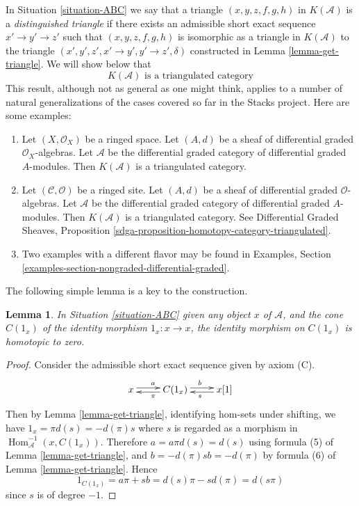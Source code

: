 \documentclass{stacks-project}
\theoremstyle{plain}
\newtheorem{lemma}[subsection]{Lemma}
\theoremstyle{definition}
\theoremstyle{remark}
\numberwithin{equation}{subsection}
\def\Hom{\mathop{\mathrm{Hom}}\nolimits}
\begin{document}
\noindent
In Situation \ref{situation-ABC} we say that a triangle
$(x, y, z, f, g, h)$ in $K(\mathcal{A})$ is a
{\it distinguished triangle} if there exists an admissible
short exact sequence $x' \to y' \to z'$ such that
$(x, y, z, f, g, h)$ is isomorphic as a triangle in $K(\mathcal{A})$
to the triangle $(x', y', z', x' \to y', y' \to z', \delta)$
constructed in Lemma \ref{lemma-get-triangle}. We will show below that
$$
\boxed{
K(\mathcal{A})\text{ is a triangulated category}
}
$$
This result, although not as general as one might think, applies to a
number of natural generalizations of the cases covered so far in the
Stacks project. Here are some examples:
\begin{enumerate}
\item Let $(X, \mathcal{O}_X)$ be a ringed space. Let $(A, d)$ be a
sheaf of differential graded $\mathcal{O}_X$-algebras. Let
$\mathcal{A}$ be the differential graded category of differential
graded $A$-modules. Then $K(\mathcal{A})$ is a triangulated category.
\item Let $(\mathcal{C}, \mathcal{O})$ be a ringed site. Let $(A, d)$ be a
sheaf of differential graded $\mathcal{O}$-algebras. Let
$\mathcal{A}$ be the differential graded category of differential
graded $A$-modules. Then $K(\mathcal{A})$ is a triangulated category.
See Differential Graded Sheaves, Proposition
\ref{sdga-proposition-homotopy-category-triangulated}.
\item Two examples with a different flavor may be found in Examples, Section
\ref{examples-section-nongraded-differential-graded}.
\end{enumerate}

\noindent
The following simple lemma is a key to the construction.

\begin{lemma}
\label{lemma-id-cone-null}
In Situation \ref{situation-ABC}
given any object $x$ of $\mathcal{A}$, and the cone $C(1_x)$ of the
identity morphism $1_x : x \to x$, the identity morphism on
$C(1_x)$ is homotopic to zero.
\end{lemma}

\begin{proof}
Consider the admissible short exact sequence given by axiom (C).
$$
\xymatrix{
x \ar@<0.5ex>[r]^a  &
C(1_x) \ar@<0.5ex>[l]^{\pi} \ar@<0.5ex>[r]^b &
x[1]\ar@<0.5ex>[l]^s
}
$$
Then by Lemma \ref{lemma-get-triangle}, identifying hom-sets under
shifting, we have $1_x=\pi d(s)=-d(\pi)s$ where $s$ is regarded as
a morphism in $\Hom_{\mathcal{A}}^{-1}(x,C(1_x))$. Therefore
$a=a\pi d(s)=d(s)$ using formula (5) of Lemma \ref{lemma-get-triangle},
and $b=-d(\pi)sb=-d(\pi)$ by formula (6) of Lemma \ref{lemma-get-triangle}.
Hence
$$
1_{C(1_x)} = a\pi + sb = d(s)\pi - sd(\pi) = d(s\pi)
$$
since $s$ is of degree $-1$.
\end{proof}
\end{document}
